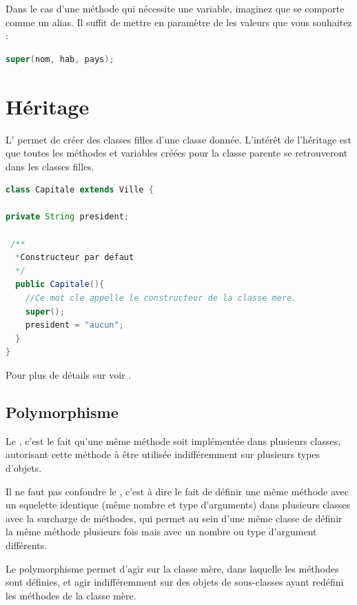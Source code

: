 \documentclass[a4paper,twoside]{article}
\begin{document}
\begin{remarque}
Dans le cas d'une méthode qui nécessite une variable, imaginez que  se comporte comme un alias. Il suffit de mettre en paramètre de  les valeurs que vous souhaitez : 
\begin{lstlisting}[language=java]
super(nom, hab, pays);
\end{lstlisting}
\end{remarque}

\section{Héritage}\label{sec:heritage}
L' permet de créer des classes filles d'une classe donnée. L'intérêt de l'héritage est que toutes les méthodes et variables créées pour la classe parente se retrouveront dans les classes filles. 

\begin{lstlisting}[language=java]
class Capitale extends Ville {
 
private String president;
 
 /**
  *Constructeur par defaut
  */
  public Capitale(){
    //Ce mot cle appelle le constructeur de la classe mere.  
    super();
    president = "aucun";
  }
}
\end{lstlisting}

Pour plus de détails sur  voir .

\subsection{Polymorphisme}
Le , c'est le fait qu'une même méthode soit implémentée dans plusieurs classes, autorisant cette méthode à être utilisée indifféremment sur plusieurs types d'objets. 

\begin{attention}
Il ne faut pas confondre le , c'est à dire le fait de définir une même méthode avec un squelette identique (même nombre et type d'arguments) dans plusieurs classes avec la surcharge de méthodes, qui permet au sein d'une même classe de définir la même méthode plusieurs fois mais avec un nombre ou type d'argument différents.
\end{attention}

Le polymorphisme permet d'agir sur la classe mère, dans laquelle les méthodes sont définies, et agir indifféremment sur des objets de sous-classes ayant redéfini les méthodes de la classe mère. 
\end{document}
